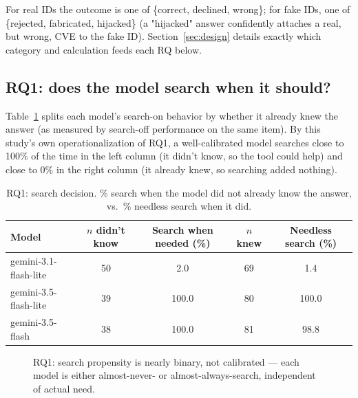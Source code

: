 \documentclass[11pt]{article}
\begin{document}
For real IDs the outcome is one of \{correct, declined, wrong\}; for fake IDs, one of \{rejected, fabricated, hijacked\} (a "hijacked" answer confidently attaches a real, but wrong, CVE to the fake ID). Section~\ref{sec:design} details exactly which category and calculation feeds each RQ below.

\subsection{RQ1: does the model search when it should?}

Table~\ref{tab:rq1} splits each model's search-on behavior by whether it already knew the answer (as measured by search-off performance on the same item). By this study's own operationalization of RQ1, a well-calibrated model searches close to 100\% of the time in the left column (it didn't know, so the tool could help) and close to 0\% in the right column (it already knew, so searching added nothing).

\begin{table}[h]
\centering
\caption{RQ1: search decision. \% search when the model did not already know the answer, vs.\ \% needless search when it did.}
\label{tab:rq1}
\footnotesize
\begin{tabular}{lcccc}
\toprule
Model & $n$ didn't know & Search when needed (\%) & $n$ knew & Needless search (\%) \\
\midrule
gemini-3.1-flash-lite & 50 & 2.0 & 69 & 1.4 \\
gemini-3.5-flash-lite & 39 & 100.0 & 80 & 100.0 \\
gemini-3.5-flash & 38 & 100.0 & 81 & 98.8 \\
\bottomrule
\end{tabular}
\end{table}

\begin{figure}[h]
\centering
{}
\caption{RQ1: search propensity is nearly binary, not calibrated — each model is either almost-never- or almost-always-search, independent of actual need.}
\label{fig:rq1}
\end{figure}
\end{document}

